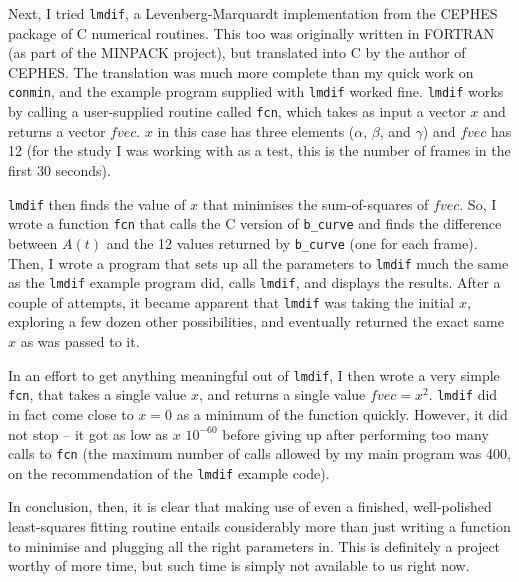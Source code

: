 Next, I tried \verb|lmdif|, a Levenberg-Marquardt implementation from
the CEPHES package of C numerical routines.  This too was originally
written in FORTRAN (as part of the MINPACK project), but translated
into C by the author of CEPHES.  The translation was much more
complete than my quick work on \verb|conmin|, and the example program
supplied with \verb|lmdif| worked fine.  \verb|lmdif| works by calling
a user-supplied routine called \verb|fcn|, which takes as input a
vector $x$ and returns a vector $fvec$.  $x$ in this case has three
elements ($\alpha$, $\beta$, and $\gamma$) and $fvec$ has 12 (for the
study I was working with as a test, this is the number of frames in
the first 30 seconds).

\verb|lmdif| then finds the value of $x$ that minimises the sum-of-squares of
$fvec$.  So, I wrote a function \verb|fcn| that calls the C version of
\verb|b_curve| and finds the difference between $A(t)$ and the 12 values
returned by \verb|b_curve| (one for each frame).  Then, I wrote a
program that sets up all the parameters to \verb|lmdif| much the same
as the \verb|lmdif| example program did, calls \verb|lmdif|, and
displays the results.  After a couple of attempts, it became apparent
that \verb|lmdif| was taking the initial $x$, exploring a few dozen
other possibilities, and eventually returned the exact same $x$ as was
passed to it.

In an effort to get anything meaningful out of \verb|lmdif|, I then
wrote a very simple \verb|fcn|, that takes a single value $x$, and
returns a single value $fvec = x^{2}$.  \verb|lmdif| did in fact come
close to $x=0$ as a minimum of the function quickly.  However, it did
not stop -- it got as low as $x$ $10^{-60}$ before giving up after
performing too many calls to \verb|fcn| (the maximum number of calls
allowed by my main program was 400, on the recommendation of the
\verb|lmdif| example code).

In conclusion, then, it is clear that making use of even a finished,
well-polished least-squares fitting routine entails considerably more
than just writing a function to minimise and plugging all the right
parameters in.  This is definitely a project worthy of more time, but
such time is simply not available to us right now.


